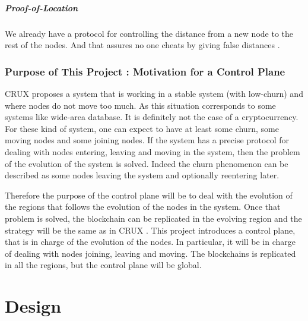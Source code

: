 \documentclass[a4paper,11pt,oneside]{report}
\begin{document}
\paragraph{Proof-of-Location} We already have a protocol for controlling
the distance from a new node to the rest of the nodes. And that assures no one
cheats by giving false distances \cite{Kall2019}. 

\subsection{Purpose of This Project : Motivation for a Control Plane}

CRUX \cite{Basescu2014} proposes a system that is working in a stable system
(with low-churn) and where nodes do not move too much. As this situation
corresponds to some systems like wide-area database. It is definitely not
the case of a cryptocurrency.  For these kind of system, one can expect to have
at least some churn, some moving nodes and some joining nodes.  If the
system has a precise protocol for dealing with nodes entering, leaving and
moving in the system, then the problem of the evolution of the system is
solved. Indeed the churn phenomenon can be described as some nodes leaving the
system and optionally reentering later. 

Therefore the purpose of the control plane will be to deal with the evolution
of the regions that follows the evolution of the nodes in the system. Once that
problem is solved, the blockchain can be replicated in the evolving region and
the strategy will be the same as in CRUX \cite{Basescu2014}. This project
introduces a control plane, that is in charge of the evolution of the nodes. In particular, it will be in charge of dealing with nodes
joining, leaving and moving. The blockchains is
replicated in all the regions, but the control plane will be global. 

\chapter{Design} \label{chap:Design}  %
\end{document}
